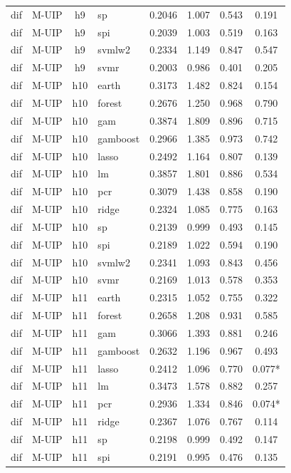 \begin{ThreePartTable}
\begin{longtable}[t]{llclcccc}
dif & M-UIP & h9 & sp & 0.2046 & 1.007 & 0.543 & 0.191\\
dif & M-UIP & h9 & spi & 0.2039 & 1.003 & 0.519 & 0.163\\
dif & M-UIP & h9 & svmlw2 & 0.2334 & 1.149 & 0.847 & 0.547\\
dif & M-UIP & h9 & svmr & 0.2003 & 0.986 & 0.401 & 0.205\\
\addlinespace
dif & M-UIP & h10 & earth & 0.3173 & 1.482 & 0.824 & 0.154\\
dif & M-UIP & h10 & forest & 0.2676 & 1.250 & 0.968 & 0.790\\
dif & M-UIP & h10 & gam & 0.3874 & 1.809 & 0.896 & 0.715\\
dif & M-UIP & h10 & gamboost & 0.2966 & 1.385 & 0.973 & 0.742\\
dif & M-UIP & h10 & lasso & 0.2492 & 1.164 & 0.807 & 0.139\\
dif & M-UIP & h10 & lm & 0.3857 & 1.801 & 0.886 & 0.534\\
dif & M-UIP & h10 & pcr & 0.3079 & 1.438 & 0.858 & 0.190\\
dif & M-UIP & h10 & ridge & 0.2324 & 1.085 & 0.775 & 0.163\\
dif & M-UIP & h10 & sp & 0.2139 & 0.999 & 0.493 & 0.145\\
dif & M-UIP & h10 & spi & 0.2189 & 1.022 & 0.594 & 0.190\\
dif & M-UIP & h10 & svmlw2 & 0.2341 & 1.093 & 0.843 & 0.456\\
dif & M-UIP & h10 & svmr & 0.2169 & 1.013 & 0.578 & 0.353\\
\addlinespace
dif & M-UIP & h11 & earth & 0.2315 & 1.052 & 0.755 & 0.322\\
dif & M-UIP & h11 & forest & 0.2658 & 1.208 & 0.931 & 0.585\\
dif & M-UIP & h11 & gam & 0.3066 & 1.393 & 0.881 & 0.246\\
dif & M-UIP & h11 & gamboost & 0.2632 & 1.196 & 0.967 & 0.493\\
dif & M-UIP & h11 & lasso & 0.2412 & 1.096 & 0.770 & 0.077*\\
dif & M-UIP & h11 & lm & 0.3473 & 1.578 & 0.882 & 0.257\\
dif & M-UIP & h11 & pcr & 0.2936 & 1.334 & 0.846 & 0.074*\\
dif & M-UIP & h11 & ridge & 0.2367 & 1.076 & 0.767 & 0.114\\
dif & M-UIP & h11 & sp & 0.2198 & 0.999 & 0.492 & 0.147\\
dif & M-UIP & h11 & spi & 0.2191 & 0.995 & 0.476 & 0.135\\

\end{longtable}
\end{ThreePartTable}
